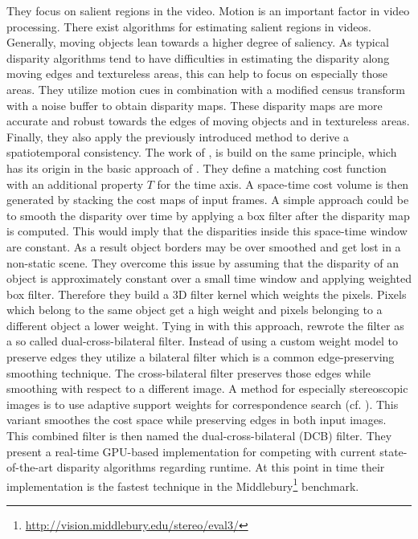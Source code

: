 They focus on salient regions in the video.
Motion is an important factor in video processing.
There exist algorithms for estimating salient regions in videos.
Generally, moving objects lean towards a higher degree of saliency.
As typical disparity algorithms tend to have difficulties in estimating the disparity along moving edges and textureless areas, this can help to focus on especially those areas.
They utilize motion cues in combination with a modified census transform with a noise buffer to obtain disparity maps.
These disparity maps are more accurate and robust towards the edges of moving objects and in textureless areas.
Finally, they also apply the previously introduced method to derive a spatiotemporal consistency.
\newline\newline\noindent The work of \citeauthor{richardt2010real} \citep{richardt2010real}, \citeauthor{hosni2012temporally} \citep{hosni2012temporally} is build on the same principle, which has its origin in the basic approach of \citeauthor{davis2003spacetime} \citep{davis2003spacetime}.
They define a matching cost function with an additional property $T$ for the time axis.
A space-time cost volume is then generated by stacking the cost maps of input frames.
A simple approach could be to smooth the disparity over time by applying a box filter after the disparity map is computed.
This would imply that the disparities inside this space-time window are constant.
As a result object borders may be over smoothed and get lost in a non-static scene.
They overcome this issue by assuming that the disparity of an object is approximately constant over a small time window and applying weighted box filter.
Therefore they build a 3D filter kernel which weights the pixels.
Pixels which belong to the same object get a high weight and pixels belonging to a different object a lower weight.
Tying in with this approach, \citeauthor{richardt2010real} \citep{richardt2010real} rewrote the filter as a so called dual-cross-bilateral filter.
Instead of using a custom weight model to preserve edges they utilize a bilateral filter which is a common edge-preserving smoothing technique.
The cross-bilateral filter preserves those edges while smoothing with respect to a different image.
A method for especially stereoscopic images is to use adaptive support weights for correspondence search (cf. \citep{yoon2006adaptive}).
This variant smoothes the cost space while preserving edges in both input images.
This combined filter is then named the dual-cross-bilateral (DCB) filter.
They present a real-time GPU-based implementation for competing with current state-of-the-art disparity algorithms regarding runtime.
At this point in time their implementation is the fastest technique in the Middlebury\footnote{\url{http://vision.middlebury.edu/stereo/eval3/}} benchmark.


